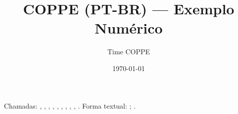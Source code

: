 \documentclass[a4paper,12pt]{article}
\title{COPPE (PT-BR) — Exemplo Numérico}
\author{Time COPPE}
\date{\today}
\begin{document}
\maketitle
Chamadas: \citep{art-1-complete-doi}, \citep{art-2-missing-doi-has-url}, \citep{edital-1-complete}, \citep{leg-1-complete},
\citep{inproc-1-complete}, \citep{proc-1-complete}, \citep{online-2-url-only-no-date}, \citep{soft-1-complete}, \citep{press-1-complete}, \citep{interv-1-complete}.
Forma textual: \citet{book-1-complete}; \citet{news-1-complete}.
\printbibliography[title={Referências (ordem de citação)}]
\end{document}
